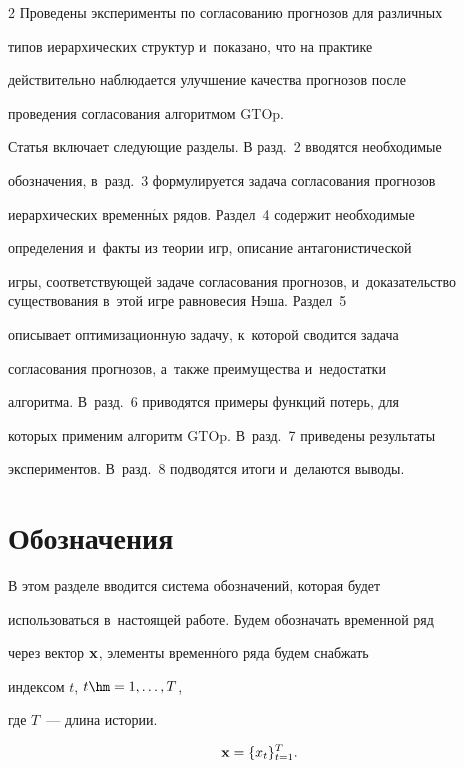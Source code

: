 \begin{multicols}{2}
Проведены эксперименты по согласова\-нию прогнозов для различных

типов иерархических структур и~показано, что на практике

действительно наблюдается улучшение качества прогнозов после

проведения согласования алгоритмом GTOp.



Статья включает следующие разделы. В разд.~2 вводятся необходимые

обозначения, в~разд.~3 формулируется задача согласования прогнозов

иерархических временн$\acute{\mbox{ы}}$х рядов. Раздел~4 содержит  необходимые

определения и~факты из теории игр, описание антагонистической

игры, со\-от\-вет\-ст\-ву\-ющей задаче согласования прогнозов, и~доказательство существования в~этой игре равновесия Нэша. Раздел~5

 описывает оптимизационную задачу, к~которой сводится задача

согласования прогнозов, а~также преимущества и~недостатки

алгоритма. В~разд.~6 приводятся примеры функций потерь, для

которых применим алгоритм GTOp. В~разд.~7 приведены результаты

экспериментов. В~разд.~8 подводятся итоги и~делаются выводы.







\section{Обозначения}



В этом разделе вводится система обозначений, которая будет

использоваться в~настоящей работе. Будем обозначать временной ряд

через вектор $\mathbf{x}$, элементы временн$\acute{\mbox{о}}$го ряда будем снабжать

индексом $t$, $t \hm= 1, \ldots, T$,

 где $T$~--- длина истории.

$$

    \x = \{ x_t \}_{t = 1}^T.

$$




\end{multicols}
